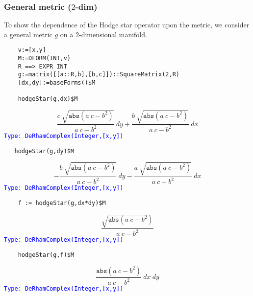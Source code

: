 \documentclass[12pt,a4paper]{article}
\newcommand{\type}[1]{\textcolor{blue}{\tt\tiny #1}}
\begin{document}
\subsubsection{General metric ($2$-dim)}
To show the dependence of the Hodge star operator upon the metric, we consider 
a general metric $g$ on a $2$-dimensional manifold. 
\begin{lstlisting}
    v:=[x,y]
    M:=DFORM(INT,v)
    R ==> EXPR INT
    g:=matrix([[a::R,b],[b,c]])::SquareMatrix(2,R)
    [dx,dy]:=baseForms()$M  
    
    hodgeStar(g,dx)$M
\end{lstlisting}
\begin{displaymath}
    \frac{c \  {\sqrt {{\mathtt{abs}
    \left({{{a \  c} -{{b} ^ {2}}}}
    \right)}}}}{{a \  c} -{{b} ^ {2}}} \  dy +
    \frac{b \  {\sqrt {{\mathtt{abs}\left(
    {{{a \  c} -{{b} ^ {2}}}}\right)}}}}
    {{a \  c} -{{b} ^ {2}}} \  dx
\end{displaymath}
\type{Type: DeRhamComplex(Integer,[x,y])}
\begin{lstlisting}
   hodgeStar(g,dy)$M 
\end{lstlisting}
\begin{displaymath}
    -\frac{b \  {\sqrt {{\mathtt{abs}
    \left({{{a \  c} -{{b} ^ {2}}}}
    \right)}}}} {{a \  c} -{{b} ^ {2}}} \  dy -  
    \frac{a \  {\sqrt {{\mathtt{abs}
    \left({{{a \  c} -{{b} ^ {2}}}} \right)}}}}
    {{a \  c} -{{b} ^ {2}}} \  dx
\end{displaymath}
\type{Type: DeRhamComplex(Integer,[x,y])}
\begin{lstlisting}
    f := hodgeStar(g,dx*dy)$M
\end{lstlisting}
\begin{displaymath}
  \frac{\sqrt {{\mathtt{abs}
   \left({{{a \  c} -{{b} ^ {2}}}}
   \right)}}}{{a \  c} -{{b} ^ {2}}}
\end{displaymath}
\type{Type: DeRhamComplex(Integer,[x,y])}
\begin{lstlisting}
    hodgeStar(g,f)$M
\end{lstlisting}
\begin{displaymath}
  \frac{\mathtt{abs}
  \left(
  {{{a \  c} -{{b} ^ {2}}}}
  \right)}
   {{a \  c} -{{b} ^ {2}}} \  dx \  dy
\end{displaymath}
\type{Type: DeRhamComplex(Integer,[x,y])}
%
\end{document}
